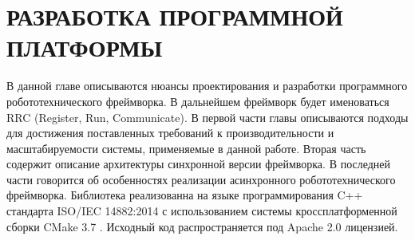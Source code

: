 \chapter{РАЗРАБОТКА ПРОГРАММНОЙ ПЛАТФОРМЫ}

В данной главе описываются нюансы проектирования и разработки программного робототехнического фреймворка. В дальнейшем фреймворк будет именоваться RRC (Register, Run, Communicate). В первой части главы описываются подходы для достижения поставленных требований к производительности и масштабируемости системы, применяемые в данной работе. Вторая часть содержит описание архитектуры синхронной версии фреймворка. В последней части говорится об особенностях реализации асинхронного робототехнического фреймворка. Библиотека реализованна на языке программирования C++ стандарта ISO/IEC 14882:2014 с использованием системы кроссплатформенной сборки CMake 3.7 \cite{martin2015mastering}. Исходный код распространяется под Apache 2.0 \cite{rosen2005open} лицензией.




